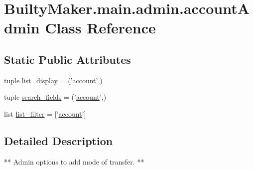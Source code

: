 \hypertarget{classBuiltyMaker_1_1main_1_1admin_1_1accountAdmin}{\section{\-Builty\-Maker.\-main.\-admin.\-account\-Admin \-Class \-Reference}
\label{classBuiltyMaker_1_1main_1_1admin_1_1accountAdmin}
}
\subsection*{\-Static \-Public \-Attributes}
\begin{DoxyCompactItemize}
\item 
tuple \hyperlink{classBuiltyMaker_1_1main_1_1admin_1_1accountAdmin_a21a45718b86569d95b1a5accaffc2f36}{list\-\_\-display} = ('\hyperlink{classBuiltyMaker_1_1main_1_1models_1_1account}{account}',)
\item 
tuple \hyperlink{classBuiltyMaker_1_1main_1_1admin_1_1accountAdmin_a0d9936f2c7e0e29d7c99ee6c0e2c29cd}{search\-\_\-fields} = ('\hyperlink{classBuiltyMaker_1_1main_1_1models_1_1account}{account}',)
\item 
list \hyperlink{classBuiltyMaker_1_1main_1_1admin_1_1accountAdmin_a9f4b96560b69e526648212075f088618}{list\-\_\-filter} = \mbox{[}'\hyperlink{classBuiltyMaker_1_1main_1_1models_1_1account}{account}'\mbox{]}
\end{DoxyCompactItemize}


\subsection{\-Detailed \-Description}
\begin{DoxyVerb}
        ** Admin options to add mode of transfer. **
\end{DoxyVerb}
 

